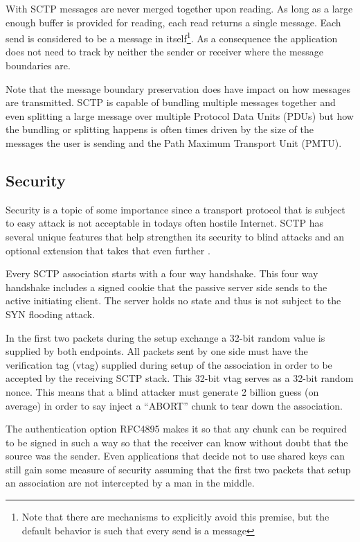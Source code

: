 \documentclass[conference]{IEEEtran}
\begin{document}
With SCTP messages are never merged together upon reading. As long
as a large enough buffer is provided for reading, each read returns a 
single message. Each send is considered to be a message in itself\footnote{Note that
there are mechanisms to explicitly avoid this premise, but the default behavior is such
that every send is a message}. As a consequence the application does not need to
track by neither the sender or receiver where the message boundaries are.

Note that the message boundary preservation does have impact on how
messages are transmitted. SCTP is capable of bundling multiple messages
together and even splitting a large message over multiple Protocol Data Units (PDUs)
but how the bundling or splitting happens is often times driven by the size of the 
messages the user is sending and the Path Maximum Transport Unit (PMTU).


\subsection{Security}
\label{secure}

Security is a topic of  some importance since a transport protocol that is subject
to easy attack is not acceptable in todays often hostile Internet. SCTP has several
unique features that help strengthen its security to blind attacks and an optional
extension that takes that even further \cite{rfc4895}.

Every SCTP association starts with a four way handshake. This four
way handshake includes a signed cookie that the passive server side
sends to the active initiating client. The server holds no state and thus
is not subject to the SYN flooding attack. 

In the first two packets during the setup exchange a 32-bit random
value is supplied by both endpoints. All packets sent by one side must
have the verification tag (vtag) supplied during setup of the association in
order to be accepted by the receiving SCTP stack. This 32-bit vtag serves
as a 32-bit random nonce. This means that a blind attacker must generate
2 billion guess (on average) in order to say inject a ``ABORT'' chunk to tear
down the association. 

The authentication option RFC4895\cite{rfc4895} makes it so that any chunk can
be required to be signed in such a way so that the receiver can know
without doubt that the source was the sender. Even applications that
decide not to use shared keys can still gain some measure of security assuming
that the first two packets that setup an association are not intercepted by a
man in the middle.
\end{document}
